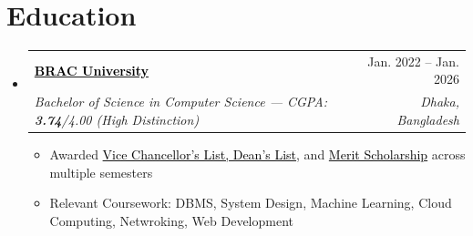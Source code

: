 \documentclass[a4paper]{article}
\makeatletter
\newcommand{\resumeItem}[1]{
  \item\small{
    {#1 \vspace{-2pt}}
  }
}
\newcommand{\resumeSubheading}[4]{
  \vspace{-2pt}\item
    \begin{tabular*}{0.97\textwidth}[t]{l@{\extracolsep{\fill}}r}
      \textbf{#1} & #2 \\
      \textit{\small#3} & \textit{\small #4} \\
    \end{tabular*}\vspace{-7pt}
}
\newcommand{\resumeSubHeadingListStart}{\begin{itemize}[leftmargin=0.15in, label={}]}
\newcommand{\resumeSubHeadingListEnd}{\end{itemize}}
\newcommand{\resumeItemListStart}{\begin{itemize}}
\newcommand{\resumeItemListEnd}{\end{itemize}\vspace{-5pt}}
\makeatother
\begin{document}
\section{Education}
  \resumeSubHeadingListStart
    \resumeSubheading
      {\href{https://www.bracu.ac.bd/}{\textcolor{black}{BRAC University}}}{Jan. 2022 -- Jan. 2026}
      {Bachelor of Science in Computer Science --- CGPA: \textbf{3.74}/4.00 (High Distinction)}{Dhaka, Bangladesh}
      \resumeItemListStart
        \resumeItem{Awarded \href{https://www.bracu.ac.bd/academics/policies-and-procedures/academic-standings-and-honors}{\textcolor{black}{Vice Chancellor's List, Dean's List}}, and \href{https://www.bracu.ac.bd/admissions/international-applicants/scholarship-financial-aid}{\textcolor{black}{Merit Scholarship}} across multiple semesters}
        \resumeItem{Relevant Coursework: DBMS, System Design, Machine Learning, Cloud Computing, Netwroking, Web Development}
      \resumeItemListEnd
  \resumeSubHeadingListEnd


\end{document}
